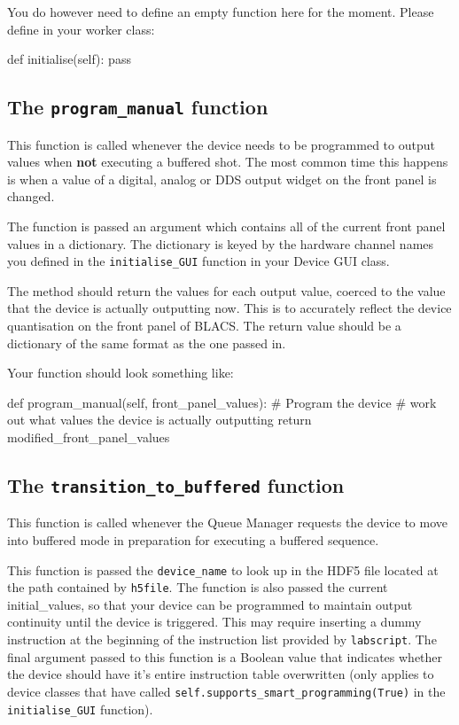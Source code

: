 \documentclass[12pt]{article}
\begin{document}
You do however need to define an empty function here for the moment.
Please define in your worker class:
\begin{python}
    def initialise(self):
        pass
\end{python}


\subsection{The \texttt{program\_manual} function}
This function is called whenever the device needs to be programmed to output values when \textbf{not} executing a buffered shot.
The most common time this happens is when a value of a digital, analog or DDS output widget on the front panel is changed.

The function is passed an argument which contains all of the current front panel values in a dictionary.
The dictionary is keyed by the hardware channel names you defined in the \texttt{initialise\_GUI} function in your Device GUI class.

The method should return the values for each output value, coerced to the value that the device is actually outputting now.
This is to accurately reflect the device quantisation on the front panel of BLACS.
The return value should be a dictionary of the same format as the one passed in.

Your function should look something like:
\begin{python}
    def program_manual(self, front_panel_values):
        # Program the device
        # work out what values the device is actually outputting
        return modified_front_panel_values
\end{python}



\subsection{The \texttt{transition\_to\_buffered} function}\label{worker:transition_to_buffered}
This function is called whenever the Queue Manager requests the device to move into buffered mode in preparation for executing a buffered sequence.

This function is passed the \texttt{device\_name} to look up in the HDF5 file located at the path contained by \texttt{h5file}.
The function is also passed the current initial\_values, so that your device can be programmed to maintain output continuity until the device is triggered.
This may require inserting a dummy instruction at the beginning of the instruction list provided by \texttt{labscript}.
The final argument passed to this function is a Boolean value that indicates whether the device should have it's entire instruction table overwritten (only applies to device classes that have called \texttt{self.supports\_smart\_programming(True)} in the \texttt{initialise\_GUI} function).
\end{document}
